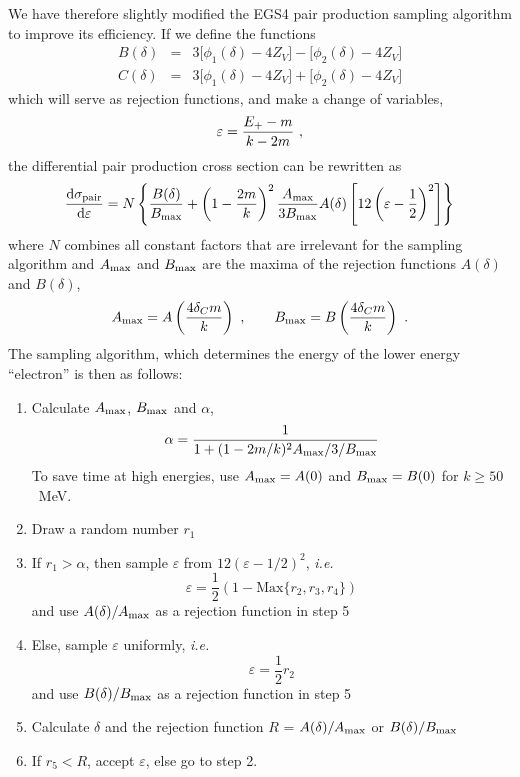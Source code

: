 We have therefore slightly modified the EGS4 pair production sampling algorithm to improve
its efficiency. If we define the functions
\begin{eqnarray}
B(\delta) & = & 3 \Big[ \phi_1(\delta) - 4 Z_V \Big] -
\Big[ \phi_2(\delta) - 4 Z_V \Big] \nonumber \\
C(\delta) & = & 3 \Big[ \phi_1(\delta) - 4 Z_V \Big] +
\Big[ \phi_2(\delta) - 4 Z_V \Big]
\end{eqnarray}
which will serve as rejection functions, and make
a change of variables,
\begin{equation}
\varepsilon  = {E_+ - m \over k - 2 m}~,
\end{equation}
the differential pair production cross section can be
rewritten as
\begin{equation}
{{\rm d} \sigma_{\rm pair} \over {\rm d} \varepsilon} =
N \left\{ {B(\delta) \over B_{\rm max}} + \left(1 - {2 m \over k} \right)^2
{A_{\rm max} \over 3 B_{\rm max}} A(\delta)
\left[ 12 \left(\varepsilon - \frac{1}{2} \right)^2 \right] \right\}
\end{equation}
where $N$ combines all constant factors that are irrelevant for
the sampling algorithm and $A_{\rm max}$ and $B_{\rm max}$ are
the maxima of the rejection functions $A(\delta)$ and $B(\delta)$,
\begin{equation}
A_{\rm max} = A\left({4 \delta_C m \over k}\right)~, \quad \quad
B_{\rm max} = B\left({4 \delta_C m \over k}\right)~.
\end{equation}
The sampling algorithm, which determines the energy
of the lower energy ``electron'' is then as follows:
\begin{enumerate}
\item
Calculate $A_{\rm max}$, $B_{\rm max}$ and $\alpha$,
\begin{equation}
\alpha = {1 \over 1 + (1 - 2 m/k)^2 A_{\rm max}/3/B_{\rm max}}
\end{equation}
To save time at high energies, use $A_{\rm max} = A(0)$ and
$B_{\rm max} = B(0)$ for $k \ge 50$~MeV.
\item
Draw a random number $r_1$
\item
If $r_1 > \alpha$, then sample $\varepsilon$
from $12 (\varepsilon - 1/2 )^2$, {\em i.e.}
\begin{equation}
\varepsilon = \frac{1}{2} \left(1 - \mbox{Max}\{r_2,r_3,r_4\}\right)
\end{equation}
and use $A(\delta)/A_{\rm max}$ as a rejection function in step 5
\item
Else, sample $\varepsilon$ uniformly, {\em i.e.}
\begin{equation}
\varepsilon = \frac{1}{2} r_2
\end{equation}
and use $B(\delta)/B_{\rm max}$ as a rejection function in step 5
\item
Calculate $\delta$ and the rejection function $R$ = $A(\delta)/A_{\rm max}$ or
$B(\delta)/B_{\rm max}$
\item
If $r_5 < R$, accept $\varepsilon$, else go to step 2.
\end{enumerate}

